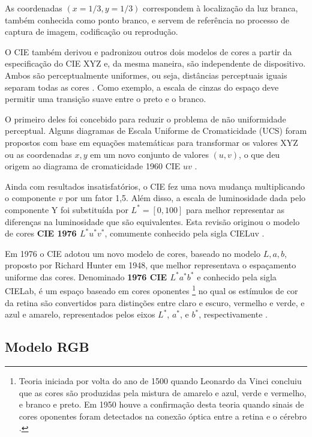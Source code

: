 As coordenadas $(x = 1/3, y = 1/3)$ correspondem à localização da luz branca, também conhecida como ponto branco, e servem de referência no processo de captura de imagem, codificação ou reprodução.

O CIE também derivou e padronizou outros dois modelos de cores a partir da especificação do CIE XYZ e, da mesma maneira, são independente de dispositivo. Ambos são perceptualmente uniformes, ou seja, distâncias perceptuais iguais separam todas as cores \citep{vezhnevets:03}. Como exemplo, a escala de cinzas do espaço deve permitir uma transição suave entre o preto e o branco.

O primeiro deles foi concebido para reduzir o problema de não uniformidade perceptual. Alguns diagramas de Escala Uniforme de Cromaticidade (UCS) foram propostos com base em equações matemáticas para transformar os valores XYZ ou as coordenadas $x, y$ em um novo conjunto de valores $(u, v)$, o que deu origem ao diagrama de cromaticidade 1960 CIE $uv$ \citep{gevers:12}.

Ainda com resultados insatisfatórios, o CIE fez uma nova mudança multiplicando o componente $v$ por um fator 1,5. Além disso, a escala de luminosidade dada pelo componente Y foi substituída por $L^* = [0, 100]$ para melhor representar as diferenças na luminosidade que são equivalentes. Esta revisão originou o modelo de cores \textbf{CIE 1976 $L^*u^*v^*$}, comumente conhecido pela sigla CIELuv \citep{gevers:12}.

Em 1976 o CIE adotou um novo modelo de cores, baseado no modelo $L, a, b$, proposto por Richard Hunter em 1948, que melhor representava o espaçamento uniforme das cores. Denominado \textbf{1976 CIE $L^*a^*b^*$} e conhecido pela sigla CIELab, é um espaço baseado em cores oponentes \footnote{Teoria iniciada por volta do ano de 1500 quando Leonardo da Vinci concluiu que as cores são produzidas pela mistura de amarelo e azul, verde e vermelho, e branco e preto. Em 1950 houve a confirmação desta teoria quando sinais de cores oponentes foram detectados na conexão óptica entre a retina e o cérebro \citep{gevers:12}.} no qual os estímulos de cor da retina são convertidos para distinções entre claro e escuro, vermelho e verde, e azul e amarelo, representados pelos eixos $L^*$, $a^*$, e $b^*$, respectivamente \citep{gevers:12}.

\subsection{Modelo RGB}
\label{sec:modelo_cores_rgb}

